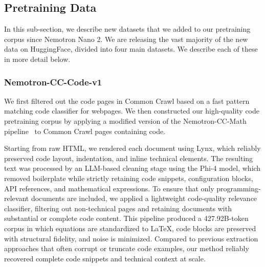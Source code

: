 \subsection{Pretraining Data}
\label{sec:pretrain_data}

In this sub-section, we describe new datasets that we added to our pretraining corpus since Nemotron Nano 2. We are releasing the vast majority of the new data on HuggingFace,
divided into four main datasets. We describe each of these in more detail below.
%


\subsubsection{Nemotron-CC-Code-v1}

We first filtered out the code pages in Common Crawl based on a fast pattern matching code classifier for webpages. We then constructed our high-quality code pretraining corpus by applying a modified version of the Nemotron-CC-Math pipeline~\citep{karimi2025nemotronccmath} to Common Crawl pages containing code. 

Starting from raw HTML, we rendered each document using Lynx, which reliably preserved code layout, indentation, and inline technical elements. The resulting text was processed by an LLM-based cleaning stage using the Phi-4 model, which removed boilerplate while strictly retaining code snippets, configuration blocks, API references, and mathematical expressions. To ensure that only programming-relevant documents are included, we applied a lightweight code-quality relevance classifier, filtering out non-technical pages and retaining documents with substantial or complete code content. This pipeline produced a 427.92B-token corpus in which equations are standardized to LaTeX, code blocks are preserved with structural fidelity, and noise is minimized. Compared to previous extraction approaches that often corrupt or truncate code examples, our method reliably recovered complete code snippets and technical context at scale. %


